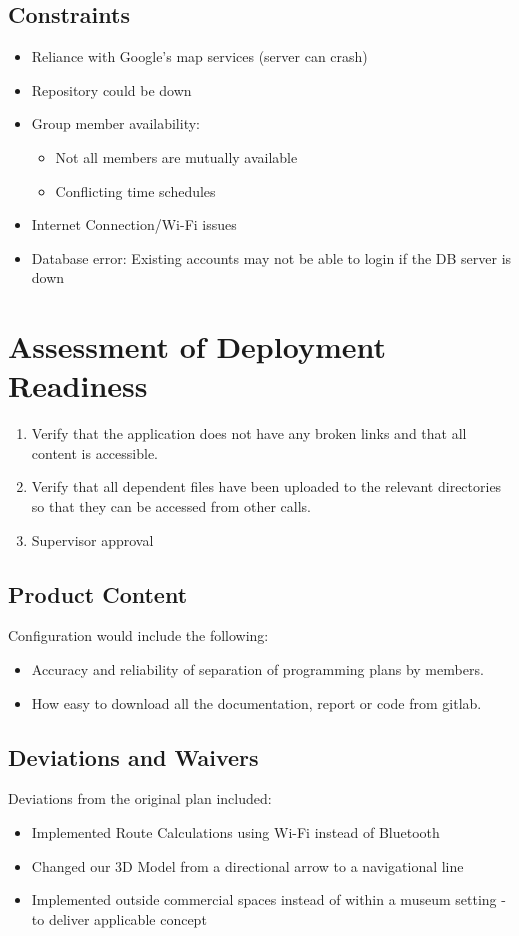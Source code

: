 \documentclass[12pt]{article}
\begin{document}
\subsection{Constraints}
\begin{itemize}
    \item Reliance with Google's map services (server can crash)
    \item Repository could be down
    \item Group member availability:
    \begin{itemize}
        \item Not all members are mutually available
        \item Conflicting time schedules
    \end{itemize}
    \item Internet Connection/Wi-Fi issues
    \item Database error: Existing accounts may not be able to login if the DB server is down
\end{itemize}

\section{Assessment of Deployment Readiness}
\begin{enumerate}
    \item Verify that the application does not have any broken links and that all content is accessible.
    \item Verify that all dependent files have been uploaded to the relevant directories so that they can be accessed from other calls.
    \item Supervisor approval
\end{enumerate}
\subsection{Product Content}
Configuration would include the following:
\begin{itemize}
    \item Accuracy and reliability of separation of programming plans by members.
    \item How easy to download all the documentation, report or code from gitlab.
\end{itemize}
\subsection{Deviations and Waivers}
Deviations from the original plan included:
\begin{itemize}
    \item Implemented Route Calculations using Wi-Fi instead of Bluetooth
    \item Changed our 3D Model from a directional arrow to a navigational line
    \item Implemented outside commercial spaces instead of within a museum setting - to deliver applicable concept
\end{itemize}
\end{document}
